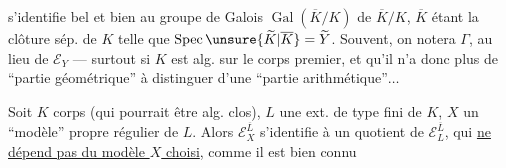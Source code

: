 
s'identifie bel et bien au groupe de Galois $\operatorname{Gal}(\overline K/K)$ de  $\overline K/K$, $\overline K$ étant la clôture sép. de $K$ telle que $\operatorname{Spec}\unsure{\widetilde K|\overline K}=\widetilde Y$. Souvent, on notera $\Gamma$,  au lieu de $\mathcal E_Y$ --- surtout si $K$ est alg. sur le corps premier, et qu'il n'a donc plus de ``partie géométrique'' à distinguer d'une ``partie arithmétique''$\ldots$

Soit  $K$  corps (qui pourrait être alg. clos), $L$ une ext. de type fini de $K$, $X$ un ``modèle'' propre régulier de $L$. Alors $\mathcal E_X^{\overline L}$ s'identifie à un quotient de $\mathcal E_L^{\overline L}$, qui \uline{ne  dépend pas du modèle $X$ choisi}, comme il est bien connu

